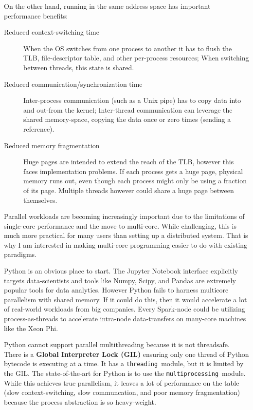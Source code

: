 \documentclass[letterpaper,twocolumn,10pt]{article}
\newcommand{\citeme}{}
\begin{document}
On the other hand, running in the same address space has important performance benefits:

\begin{description}
\item[Reduced context-switching time]
  When the OS switches from one process to another it has to flush the TLB, file-descriptor table, and other per-process resources;
  When switching between threads, this state is shared\citeme.
\item[Reduced communication/synchronization time]
  Inter-process communication (such as a Unix pipe) has to copy data into and out-from the kernel;
  Inter-thread communication can leverage the shared memory-space, copying the data once or zero times (sending a reference)\citeme.
\item[Reduced memory fragmentation]
  Huge pages are intended to extend the reach of the TLB, however this faces implementation problems.
  If each process gets a huge page, physical memory runs out, even though each process might only be using a fraction of its page.
  Multiple threads however could share a huge page between themselves\citeme.
\end{description}

Parallel workloads are becoming increasingly important due to the limitations of single-core performance and the move to multi-core\citeme.
While challenging, this is much more practical for many users than setting up a distributed system.
That is why I am interested in making multi-core programming easier to do with existing paradigms.

Python is an obvious place to start.
The Jupyter Notebook interface explicitly targets data-scientists and tools like Numpy, Scipy, and Pandas are extremely popular tools for data analytics.
However Python fails to harness multicore parallelism with shared memory.
If it could do this, then it would accelerate a lot of real-world workloads from big companies.
Every Spark-node could be utilizing process-as-threads to accelerate intra-node data-transfers on many-core machines like the Xeon Phi.

Python cannot support parallel multithreading because it is not threadsafe\citeme.
There is a \textbf{Global Interpreter Lock (GIL)} ensuring only one thread of Python bytecode is executing at a time\citeme.
It has a \texttt{threading}~\citeme module, but it is limited by the GIL.
The state-of-the-art for Python is to use the \texttt{multiprocessing}~\citeme module\citeme.
While this achieves true parallelism, it leaves a lot of performance on the table (slow context-switching, slow communcation, and poor memory fragmentation) because the process abstraction is so heavy-weight.
\end{document}
